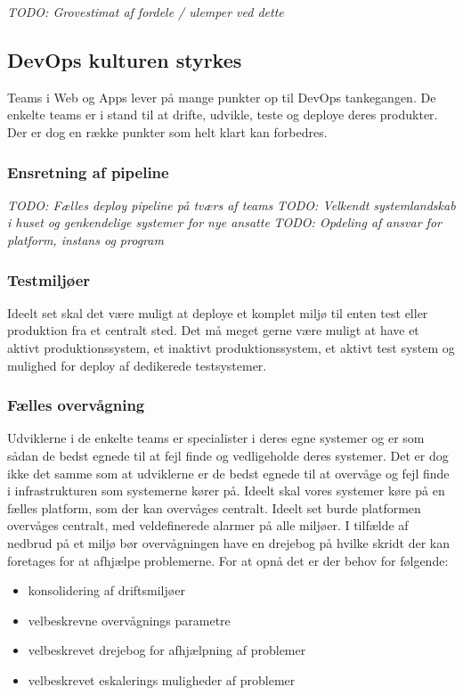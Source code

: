 \documentclass{article}
\begin{document}
    \textit{TODO: Grovestimat af fordele / ulemper ved dette}


\subsection{DevOps kulturen styrkes}
Teams i Web og Apps lever på mange punkter op til DevOps tankegangen. De enkelte teams er i stand til at drifte, udvikle, teste og deploye deres produkter.  Der er dog en række punkter som helt klart kan forbedres.

\subsubsection{Ensretning af pipeline}
    \textit{TODO: Fælles deploy pipeline på tværs af teams}
    \textit{TODO:  Velkendt systemlandskab i huset og genkendelige systemer for nye ansatte}
    \textit{TODO:  Opdeling af ansvar for platform, instans og program}

\subsubsection{Testmiljøer}
Ideelt set skal det være muligt at deploye et komplet miljø til enten test eller produktion fra et centralt sted. Det må meget gerne være muligt at have et aktivt produktionssystem, et inaktivt produktionssystem, et aktivt test system og mulighed for deploy af dedikerede testsystemer. 


\subsubsection{Fælles overvågning}
Udviklerne i de enkelte teams er specialister i deres egne systemer og er som sådan de bedst egnede til at fejl finde og vedligeholde deres systemer. Det er dog ikke det samme som at udviklerne er de bedst egnede til at overvåge og fejl finde i infrastrukturen som systemerne kører på. Ideelt skal vores systemer køre på en fælles platform, som der kan overvåges centralt.
Ideelt set burde platformen overvåges centralt, med veldefinerede alarmer på alle miljøer. I tilfælde af nedbrud på et miljø bør overvågningen have en drejebog på hvilke skridt der kan foretages for at afhjælpe problemerne.
For at opnå det er der behov for følgende:
\begin{itemize}
\item konsolidering af driftsmiljøer
\item velbeskrevne overvågnings parametre
\item velbeskrevet drejebog for afhjælpning af problemer
\item velbeskrevet eskalerings muligheder af problemer
\end{itemize}
\end{document}

